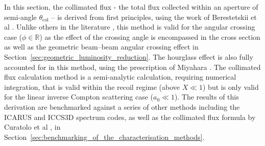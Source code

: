 \documentclass[../main.tex]{subfiles}
\begin{document}
In this section, the collimated flux - the total flux collected within an aperture of semi-angle $\theta_{\mathrm{col}}$ -- is derived from first principles, using the work of Berestetskii et al \cite{berestetskii1982quantum}. Unlike others in the literature \cite{curatolo2017analytical}, this method is valid for the angular crossing case ($\phi\in\mathbb{R}$) as the effect of the crossing angle is encompassed in the cross section as well as the geometric beam--beam angular crossing effect in Section~\ref{sec:geometric_luminosity_reduction}. The hourglass effect is also fully accounted for in this method, using the prescription of Miyahara \cite{miyahara2008luminosity}. The collimated flux calculation method is a semi-analytic calculation, requiring numerical integration, that is valid within the recoil regime (above $X\ll1$) but is only valid for the linear inverse Compton scattering case ($a_{0}\ll1$). The results of this derivation are benchmarked against a series of other methods including the \textsc{ICARUS} and \textsc{ICCS3D} spectrum codes, as well as the collimated flux formula by Curatolo et al \cite{curatolo2017analytical}, in Section~\ref{sec:benchmarking_of_the_characterisation_methods}.
\end{document}
